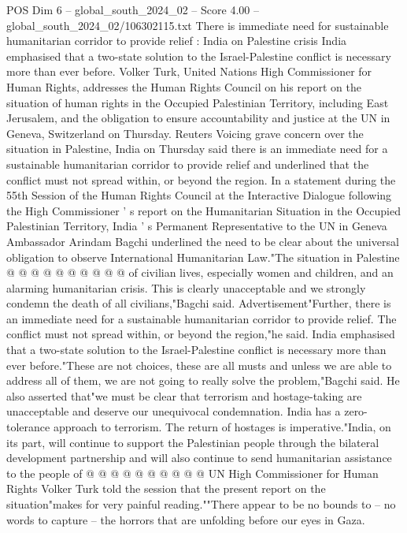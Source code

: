 \begin{textsample}{POS Dim 6 – global\_south\_2024\_02 – Score 4.00 – global\_south\_2024\_02/106302115.txt}  \label{ex:f6_pos_166}
There is immediate need for sustainable humanitarian corridor to provide relief : India on Palestine crisis India emphasised that a two-state solution to the Israel-Palestine conflict is necessary more than ever before.
Volker Turk, United Nations High Commissioner for Human Rights, addresses the Human Rights Council on his report on the situation of human rights in the Occupied Palestinian Territory, including East Jerusalem, and the obligation to ensure accountability and justice at the UN in Geneva, Switzerland on Thursday.
Reuters Voicing grave concern over the situation in Palestine, India on Thursday said there is an immediate need for a sustainable humanitarian corridor to provide relief and underlined that the conflict must not spread within, or beyond the region.
In a statement during the 55th Session of the Human Rights Council at the Interactive Dialogue following the High Commissioner ' s report on the Humanitarian Situation in the Occupied Palestinian Territory, India ' s Permanent Representative to the UN in Geneva Ambassador Arindam Bagchi underlined the need to be clear about the universal obligation to observe International Humanitarian Law."The situation in Palestine @ @ @ @ @ @ @ @ @ @ of civilian lives, especially women and children, and an alarming humanitarian crisis.
This is clearly unacceptable and we strongly condemn the death of all civilians,"Bagchi said.
Advertisement"Further, there is an immediate need for a sustainable humanitarian corridor to provide relief.
The conflict must not spread within, or beyond the region,"he said.
India emphasised that a two-state solution to the Israel-Palestine conflict is necessary more than ever before."These are not choices, these are all musts and unless we are able to address all of them, we are not going to really solve the problem,"Bagchi said.
He also asserted that"we must be clear that terrorism and hostage-taking are unacceptable and deserve our unequivocal condemnation.
India has a zero-tolerance approach to terrorism.
The return of hostages is imperative."India, on its part, will continue to support the Palestinian people through the bilateral development partnership and will also continue to send humanitarian assistance to the people of @ @ @ @ @ @ @ @ @ @ UN High Commissioner for Human Rights Volker Turk told the session that the present report on the situation"makes for very painful reading.""There appear to be no bounds to -- no words to capture -- the horrors that are unfolding before our eyes in Gaza.

\end{textsample}
